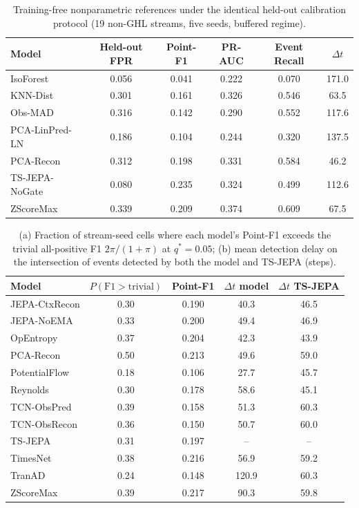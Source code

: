 \begin{table}[t]
\centering
\scriptsize
\caption{Training-free nonparametric references under the identical held-out calibration protocol (19 non-GHL streams, five seeds, buffered regime).}\label{tab:nonparametric}
\begin{tabular}{@{}lccccc@{}}
\toprule
Model & Held-out FPR & Point-F1 & PR-AUC & Event Recall & $\Delta t$ \\
\midrule
IsoForest & 0.056 & 0.041 & 0.222 & 0.070 & 171.0 \\
KNN-Dist & 0.301 & 0.161 & 0.326 & 0.546 & 63.5 \\
Obs-MAD & 0.316 & 0.142 & 0.290 & 0.552 & 117.6 \\
PCA-LinPred-LN & 0.186 & 0.104 & 0.244 & 0.320 & 137.5 \\
PCA-Recon & 0.312 & 0.198 & 0.331 & 0.584 & 46.2 \\
TS-JEPA-NoGate & 0.080 & 0.235 & 0.324 & 0.499 & 112.6 \\
ZScoreMax & 0.339 & 0.209 & 0.374 & 0.609 & 67.5 \\
\bottomrule
\end{tabular}
\end{table}

\begin{table}[t]
\centering
\scriptsize
\caption{(a) Fraction of stream-seed cells where each model's Point-F1 exceeds the trivial all-positive F1 $2\pi/(1{+}\pi)$ at $q^*{=}0.05$; (b) mean detection delay on the intersection of events detected by both the model and TS-JEPA (steps).}\label{tab:trivial_delay}
\begin{tabular}{@{}lcccc@{}}
\toprule
Model & $P(\mathrm{F1} > \mathrm{trivial})$ & Point-F1 & $\Delta t$ model & $\Delta t$ TS-JEPA \\
\midrule
JEPA-CtxRecon & 0.30 & 0.190 & 40.3 & 46.5 \\
JEPA-NoEMA & 0.33 & 0.200 & 49.4 & 46.9 \\
OpEntropy & 0.37 & 0.204 & 42.3 & 43.9 \\
PCA-Recon & 0.50 & 0.213 & 49.6 & 59.0 \\
PotentialFlow & 0.18 & 0.106 & 27.7 & 45.7 \\
Reynolds & 0.30 & 0.178 & 58.6 & 45.1 \\
TCN-ObsPred & 0.39 & 0.158 & 51.3 & 60.3 \\
TCN-ObsRecon & 0.36 & 0.150 & 50.7 & 60.0 \\
TS-JEPA & 0.31 & 0.197 & -- & -- \\
TimesNet & 0.38 & 0.216 & 56.9 & 59.2 \\
TranAD & 0.24 & 0.148 & 120.9 & 60.3 \\
ZScoreMax & 0.39 & 0.217 & 90.3 & 59.8 \\
\bottomrule
\end{tabular}
\end{table}

